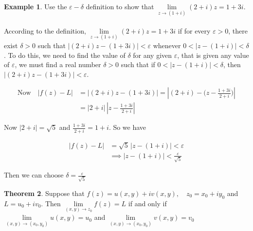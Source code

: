 \documentclass[11pt,a4paper]{article}
\theoremstyle{definition}
\newtheorem{thm}{Theorem}[section]
\newtheorem{example}[thm]{Example}
\begin{document}
\begin{example}
Use the $\varepsilon - \delta$ definition to show that $\lim\limits_{z \rightarrow (1 + i)}(2 + i) z = 1 + 3i$.\\



\text{\textcolor{red}{Solution}}\\
According to the definition, $\lim\limits_{z \rightarrow (1 + i)}(2 + i) z = 1 + 3i$ if for every $\varepsilon > 0$, there exist $\delta > 0$ such that $\left|(2 + i)z - (1 + 3i)\right| < \varepsilon$ whenever $0 < \left|z - (1 + i)\right| < \delta$. To do this, we need to find the value of $\delta$ for any given $\varepsilon$, that is given any value of $\varepsilon$, we must find a real number $\delta > 0$ such that if $0 < \left|z - (1 + i)\right| < \delta$, then $\left|(2 + i) z - (1 + 3i)\right| < \varepsilon$.

\begin{align*}
\text{Now}\quad  \left|f(z) - L\right| & = \left|(2 + i)z - (1 + 3i)\right| = \left|(2 + i) -\Big(z - \frac{1 + 3i}{2 + i}\Big)\right|\\
& = \left|2 + i\right|\,\left|z - \frac{1 + 3i}{2 + i}\right|
\end{align*}

Now $\left|2 + i\right| = \sqrt{5}$ and $\frac{1 + 3i}{2  + i} = 1 + i$. So we have


\begin{align*}
\left|f(z) - L\right| & = \sqrt{5}\,\left|z - (1 + i)\right|  < \varepsilon\\
& \implies \left|z - (1 + i)\right| < \frac{\varepsilon}{\sqrt{5}}
\end{align*}

Then we can choose $\delta = \frac{\varepsilon}{\sqrt{5}}$
\end{example}

\begin{thm}
Suppose that $f(z) = u(x,y) + i v(x,y), \quad  z_0 = x_0 + i y_0$ and  $L = u_0 + i v_0$. Then $\lim\limits_{(x,y) \rightarrow z_0}f(z) = L$ if and only if $\lim\limits_{(x,y)\rightarrow (x_0, y_0)} u(x,y) = u_0$ and $\lim\limits_{(x,y)\rightarrow (x_0, y_0)} v(x,y) = v_0$
\end{thm}
\end{document}
